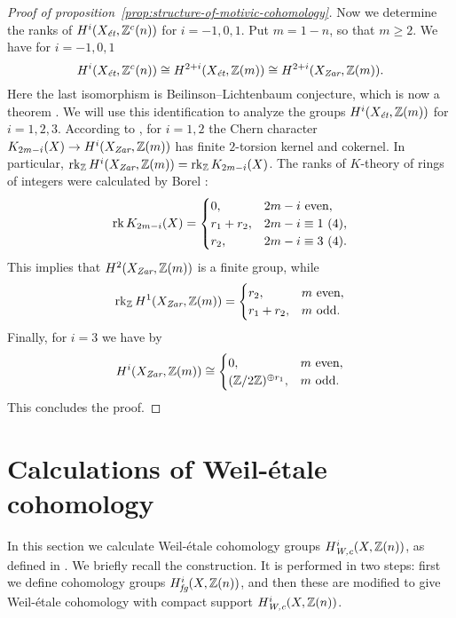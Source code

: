 \documentclass{article}
\numberwithin{equation}{section}
\begin{document}
\begin{proof}[Proof of proposition~\ref{prop:structure-of-motivic-cohomology}]
  Now we determine the ranks of $H^i (X_\et, \ZZ^c (n))$ for $i = -1,0,1$.
  Put $m = 1-n$, so that $m \ge 2$. We have for $i = -1,0,1$
  \[ H^i (X_\et, \ZZ^c(n)) \cong
    H^{2+i} (X_\et, \ZZ (m)) \cong
    H^{2+i} (X_\Zar, \ZZ(m)). \]
  Here the last isomorphism is Beilinson--Lichtenbaum conjecture,
  which is now a theorem \cite[Theorem~1.2]{Geisser-2004-Dedekind}.
  We will use this identification to analyze
  the groups $H^i (X_\et, \ZZ (m))$ for $i = 1,2,3$. According to
  \cite[Proposition~2.1]{Kolster-Sands-2008}, for $i = 1,2$ the Chern
  character
  $K_{2m - i} (X) \to H^i (X_\Zar, \ZZ(m))$
  has finite $2$-torsion kernel and cokernel. In particular,
  $\rk_\ZZ H^i (X_\Zar, \ZZ(m)) = \rk_\ZZ K_{2m - i} (X)$.
  The ranks of $K$-theory of rings of integers were calculated by Borel
  \cite{Borel-1974}:
  \[ \rk K_{2m-i} (X) = \begin{cases}
      0, & 2m - i \text{ even}, \\
      r_1 + r_2, & 2m - i \equiv 1 ~ (4), \\
      r_2, & 2m - i \equiv 3 ~ (4).
    \end{cases} \]
  This implies that $H^2 (X_\Zar, \ZZ(m))$ is a finite group, while
  \[ \rk_\ZZ H^1 (X_\Zar, \ZZ(m)) =
    \begin{cases}
      r_2, & m \text{ even}, \\
      r_1 + r_2, & m \text{ odd}.
    \end{cases} \]
  Finally, for $i = 3$ we have by \cite[p.\,179]{Kolster-Sands-2008}
  \[ H^i (X_\Zar, \ZZ (m)) \cong
    \begin{cases}
      0, & m\text{ even}, \\
      (\ZZ/2\ZZ)^{\oplus r_1}, & m\text{ odd}.
    \end{cases} \]
  This concludes the proof.
\end{proof}


\section{Calculations of Weil-étale cohomology}
\label{sec:Weil-etale-cohomology-of-X}

In this section we calculate Weil-étale cohomology groups $H^i_\Wc (X, \ZZ(n))$,
as defined in \cite{Beshenov-Weil-etale-1}. We briefly recall the
construction. It is performed in two steps: first we define cohomology groups
$H^i_\fg (X, \ZZ(n))$, and then these are modified to give Weil-étale cohomology
with compact support $H^i_\Wc (X, \ZZ(n))$.
\end{document}
